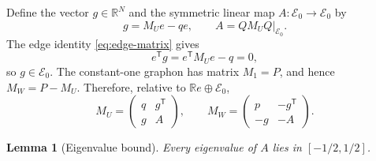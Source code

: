 \documentclass[11pt]{article}
\newtheorem{lemma}[theorem]{Lemma}
\numberwithin{equation}{section}
\newcommand{\R}{\mathbb R}
\begin{document}
Define the vector $g\in\R^N$ and the symmetric linear map
$A\colon\mathcal E_0\to\mathcal E_0$ by
\begin{equation*}
  g=M_Ue-qe,
  \qquad
  A=QM_UQ\big|_{\mathcal E_0}.
\end{equation*}
The edge identity \eqref{eq:edge-matrix} gives
\[
  e^{\mathsf T}g=e^{\mathsf T}M_Ue-q=0,
\]
so $g\in\mathcal E_0$.
The constant-one graphon has matrix $M_1=P$, and hence $M_W=P-M_U$.
Therefore, relative to $\R e\oplus\mathcal E_0$,
\begin{equation}\label{eq:block-UW}
  M_U=
  \begin{pmatrix}
    q&g^{\mathsf T}\\
    g&A
  \end{pmatrix},
  \qquad
  M_W=
  \begin{pmatrix}
    p&-g^{\mathsf T}\\
    -g&-A
  \end{pmatrix}.
\end{equation}

\begin{lemma}[Eigenvalue bound]\label{lem:half-norm}
  Every eigenvalue of $A$ lies in $[-1/2,1/2]$.
\end{lemma}
\end{document}
